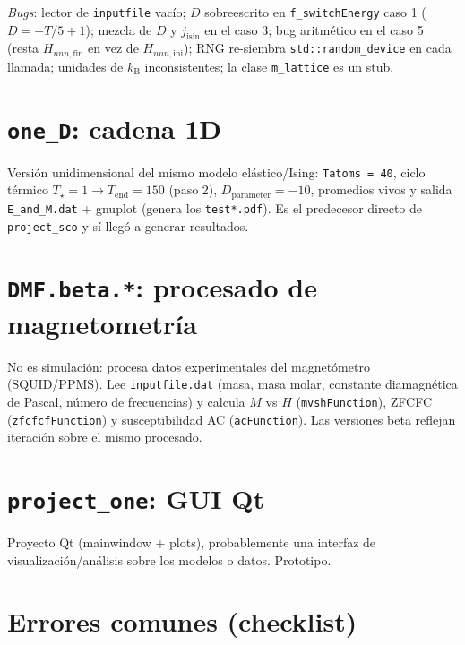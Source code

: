 \documentclass[11pt,a4paper]{article}
\newcommand{\kb}{k_{\mathrm{B}}}
\begin{document}
\emph{Bugs}: lector de \texttt{inputfile} vacío; $D$ sobreescrito en
\texttt{f\_switchEnergy} caso 1 ($D = -T/5 + 1$); mezcla de $D$ y $j_{\mathrm{isin}}$
en el caso 3; bug aritmético en el caso 5 (resta $H_{nnn,\mathrm{fin}}$ en vez de
$H_{nnn,\mathrm{ini}}$); RNG re-siembra \texttt{std::random\_device} en cada
llamada; unidades de $\kb$ inconsistentes; la clase \texttt{m\_lattice} es un stub.

\section{\texttt{one\_D}: cadena 1D}

Versión unidimensional del mismo modelo elástico/Ising: \texttt{Tatoms = 40},
ciclo térmico $T_{\star}=1 \to T_{\mathrm{end}}=150$ (paso 2),
$D_{\mathrm{parameter}} = -10$, promedios vivos y salida \texttt{E\_and\_M.dat} +
gnuplot (genera los \texttt{test*.pdf}). Es el predecesor directo de
\texttt{project\_sco} y sí llegó a generar resultados.

\section{\texttt{DMF.beta.*}: procesado de magnetometría}

No es simulación: procesa datos experimentales del magnetómetro (SQUID/PPMS).
Lee \texttt{inputfile.dat} (masa, masa molar, constante diamagnética de Pascal,
número de frecuencias) y calcula $M$ vs $H$ (\texttt{mvshFunction}), ZFCFC
(\texttt{zfcfcfFunction}) y susceptibilidad AC (\texttt{acFunction}). Las
versiones beta reflejan iteración sobre el mismo procesado.

\section{\texttt{project\_one}: GUI Qt}

Proyecto Qt (mainwindow + plots), probablemente una interfaz de
visualización/análisis sobre los modelos o datos. Prototipo.

\section{Errores comunes (checklist)}
\end{document}
